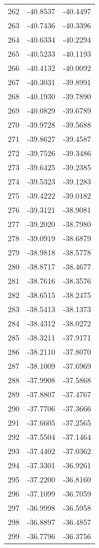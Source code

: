 \documentclass{article}
\begin{document}
\begin{longtable}{|c|c|c|}
262 & -40.8537 & -40.4497 \\
263 & -40.7436 & -40.3396 \\
264 & -40.6334 & -40.2294 \\
265 & -40.5233 & -40.1193 \\
266 & -40.4132 & -40.0092 \\
267 & -40.3031 & -39.8991 \\
268 & -40.1930 & -39.7890 \\
269 & -40.0829 & -39.6789 \\
270 & -39.9728 & -39.5688 \\
271 & -39.8627 & -39.4587 \\
272 & -39.7526 & -39.3486 \\
273 & -39.6425 & -39.2385 \\
274 & -39.5323 & -39.1283 \\
275 & -39.4222 & -39.0182 \\
276 & -39.3121 & -38.9081 \\
277 & -39.2020 & -38.7980 \\
278 & -39.0919 & -38.6879 \\
279 & -38.9818 & -38.5778 \\
280 & -38.8717 & -38.4677 \\
281 & -38.7616 & -38.3576 \\
282 & -38.6515 & -38.2475 \\
283 & -38.5413 & -38.1373 \\
284 & -38.4312 & -38.0272 \\
285 & -38.3211 & -37.9171 \\
286 & -38.2110 & -37.8070 \\
287 & -38.1009 & -37.6969 \\
288 & -37.9908 & -37.5868 \\
289 & -37.8807 & -37.4767 \\
290 & -37.7706 & -37.3666 \\
291 & -37.6605 & -37.2565 \\
292 & -37.5504 & -37.1464 \\
293 & -37.4402 & -37.0362 \\
294 & -37.3301 & -36.9261 \\
295 & -37.2200 & -36.8160 \\
296 & -37.1099 & -36.7059 \\
297 & -36.9998 & -36.5958 \\
298 & -36.8897 & -36.4857 \\
299 & -36.7796 & -36.3756 \\

\end{longtable}
\end{document}
